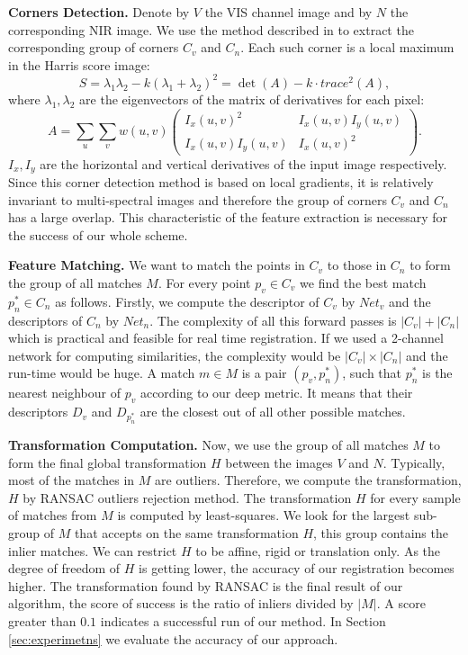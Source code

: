 \documentclass[10pt,twocolumn,letterpaper]{article}
\begin{document}
\textbf{Corners Detection.}
Denote by $V$ the VIS channel image and by $N$ the corresponding NIR image. We use the method described in \cite{harris} to extract the corresponding group of corners $C_v$ and $C_n$. Each such corner is a local maximum in the Harris score image:
\begin{equation}
S = \lambda_1\lambda_2-k(\lambda_1+\lambda_2)^2 = \det(A)-k\cdot trace^2(A),
\end{equation}
where $\lambda_1,\lambda_2$ are the eigenvectors of the matrix of derivatives for each pixel: 
\begin{equation} \label{eq:harrisMatrix}
A = \sum_u \sum_v w(u,v)
\begin{pmatrix}
I_x(u,v)^2 & I_x(u,v)I_y(u,v) \\ 
I_x(u,v)I_y(u,v) & I_x(u,v)^2
\end{pmatrix}.
\end{equation}
$I_x,I_y$ are the horizontal and vertical derivatives of the input image respectively. Since this corner detection method is based on local gradients, it is relatively invariant to multi-spectral images and therefore the group of corners $C_v$ and $C_n$ has a large overlap. This characteristic of the feature extraction is necessary for the success of our whole scheme.

\textbf{Feature Matching.}
We want to match the points in $C_v$ to those in $C_n$ to form the group of all matches $M$. For every point $p_v \in C_v$ we find the best match $p^*_n\in C_n$ as follows. Firstly, we compute the descriptor of $C_v$ by $Net_v$ and the descriptors of $C_n$ by $Net_n$. The complexity of all this forward passes is $|C_v|+|C_n|$ which is practical and feasible for real time registration. If we used a 2-channel network for computing similarities, the complexity would be $|C_v|\times|C_n|$ and the run-time would be huge. A match $m \in M$ is a pair $(p_v,p^*_n)$, such that $p^*_n$ is the nearest neighbour of $p_v$ according to our deep metric. It means that their descriptors $D_v$ and $D_{p^*_n}$ are the closest out of all other possible matches.

\textbf{Transformation Computation.}
Now, we use the group of all matches $M$ to form the final global transformation $H$ between the images $V$ and $N$. Typically, most of the matches in $M$ are outliers. Therefore, we compute the transformation, $H$ by RANSAC \cite{ransac} outliers rejection method. The transformation $H$ for every sample of matches from $M$ is computed by least-squares. We look for the largest sub-group of $M$ that accepts on the same transformation $H$, this group contains the inlier matches. We can restrict $H$ to be affine, rigid or translation only. As the degree of freedom of $H$ is getting lower, the accuracy of our registration becomes higher. The transformation found by RANSAC is the final result of our algorithm, the score of success is the ratio of inliers divided by $|M|$. A score greater than $0.1$ indicates a successful run of our method. In Section \ref{sec:experimetns} we evaluate the accuracy of our approach.
\end{document}
